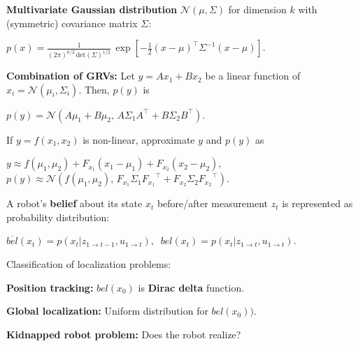 \documentclass[landscape]{article}
\newcommand{\vmspace}{\vspace{-7pt}}
\newcommand{\vpspace}{\vspace{5pt}}
\begin{document}
\begin{multicols}{3}
\vpspace

\begin{minipage}{\columnwidth}
  \textbf{Multivariate Gaussian distribution} $\mathcal N(\mu, \Sigma)$ for
  dimension $k$ with (symmetric) covariance matrix $\Sigma$:
  \vmspace
  \begin{center}
    $
    p(x)
    =
    \frac{1}{(2\pi)^{k/2}\,\mathrm{det}(\Sigma)^{1/2}}\,
    \exp\left[
    -\frac{1}{2}(x-\mu)^\intercal \Sigma^{-1} (x-\mu)
    \right].
    $
  \end{center}
\end{minipage}

\vpspace

\begin{minipage}{\columnwidth}
  \textbf{Combination of GRVs:} Let $y=Ax_1 + Bx_2$ be a linear function of
  $x_i=\mathcal N(\mu_i, \Sigma_i)$. Then, $p(y)$ is
  \vmspace
  \begin{center}
    $
    p(y) = \mathcal N (A\mu_1 + B\mu_2,\,
    A\Sigma_1A^\intercal + B\Sigma_2B^\intercal).
    $
  \end{center}
  \vmspace
  If $y=f(x_1,x_2)$ is non-linear, approximate $y$ and $p(y)$ as
  \vmspace
  \begin{center}
    $
    y \approx f(\mu_1, \mu_2) + F_{x_1} (x_1 - \mu_1) + F_{x_2}(x_2 -
    \mu_2),\;\;$\\
    $p(y) \approx \mathcal N(f(\mu_1, \mu_2),\,
    F_{x_1}\Sigma_1{F_{x_1}}^\intercal +
    F_{x_2}\Sigma_2{F_{x_2}}^\intercal).
    $
  \end{center}
\end{minipage}

\vpspace

\begin{minipage}{\columnwidth}
  A robot's \textbf{belief} about its state $x_t$ before/after measurement $z_t$
  is represented as probability distribution:
  \vmspace
  \begin{center}
    $
    \overline{bel}(x_t)
    =
    p(x_t | z_{1 \rightarrow t-1}, u_{1 \rightarrow t}),\;\;
    bel(x_t)
    =
    p(x_t | z_{1 \rightarrow t}, u_{1 \rightarrow t}).
    $
  \end{center}
\end{minipage}

\vpspace

\begin{minipage}{\columnwidth}
  Classification of localization problems:
  \begin{compactitem}
  \item \textbf{Position tracking:} $bel(x_0)$ is \textbf{Dirac delta}
    function.
  \item \textbf{Global localization:} Uniform distribution for $bel(x_0))$.
  \item \textbf{Kidnapped robot problem:} Does the robot realize?
  \end{compactitem}
\end{minipage}


\end{multicols}
\end{document}
